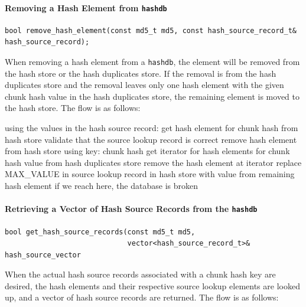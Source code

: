 \documentclass[10pt,twoside]{article}
\newcommand{\hdb}{\texttt{hashdb}\xspace}
\begin{document}
\paragraph{Removing a Hash Element from \hdb}
\begin{small}
\begin{verbatim}
bool remove_hash_element(const md5_t md5, const hash_source_record_t& hash_source_record);
\end{verbatim}
\end{small}
When removing a hash element from a \hdb,
the element will be removed from the hash store or the hash duplicates store.
If the removal is from the hash duplicates store
and the removal leaves only one hash element with the given chunk hash value
in the hash duplicates store,
the remaining element is moved to the hash store.
The flow is as follows:

\begin{algorithmic}
\STATE using the values in the hash source record:
  \RETURN \FALSE
\ENDIF
\STATE get hash element for chunk hash from hash store
  \STATE validate that the source lookup record is correct
  \STATE remove hash element from hash store using key: chunk hash
  \RETURN \TRUE
\ELSE
  \STATE get iterator for hash elements for chunk hash value from hash duplicates store
      \STATE remove the hash element at iterator
        \STATE replace MAX\_VALUE in source lookup record in hash store with value from remaining hash element
      \ENDIF
      \RETURN \TRUE
    \ENDIF
  \ENDFOR
  \STATE if we reach here, the database is broken
  \RETURN \FALSE
\ENDIF
\end{algorithmic}

\paragraph{Retrieving a Vector of Hash Source Records from the \hdb}
\begin{small}
\begin{verbatim}
bool get_hash_source_records(const md5_t md5,
                             vector<hash_source_record_t>& hash_source_vector
\end{verbatim}
\end{small}
When the actual hash source records associated with a chunk hash key are desired,
the hash elements and their respective source lookup elements are looked up,
and a vector of hash source records are returned.
The flow is as follows:
\end{document}
